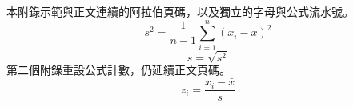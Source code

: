 本附錄示範與正文連續的阿拉伯頁碼，以及獨立的字母與公式流水號。
\begin{equation}\label{eq:appendix-a}
  s^2=\frac{1}{n-1}\sum_{i=1}^{n}(x_i-\bar{x})^2
\end{equation}
\begin{equation}\label{eq:appendix-a2}
  s=\sqrt{s^2}
\end{equation}
第二個附錄重設公式計數，仍延續正文頁碼。
\begin{equation}\label{eq:appendix-b}
  z_i=\frac{x_i-\bar{x}}{s}
\end{equation}
